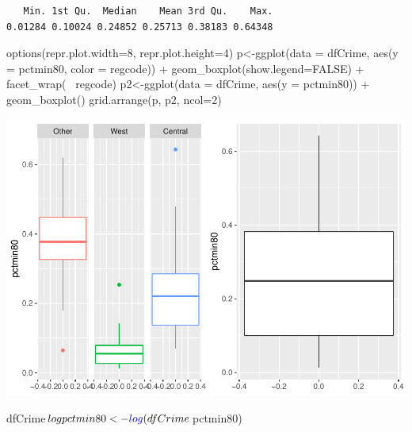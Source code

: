 \documentclass[]{article}
\newenvironment{Shaded}{}{}
\newcommand{\DataTypeTok}[1]{#1}
\newcommand{\DecValTok}[1]{#1}
\newcommand{\KeywordTok}[1]{\textcolor[rgb]{0.00,0.00,1.00}{#1}}
\newcommand{\NormalTok}[1]{#1}
\newcommand{\OperatorTok}[1]{#1}
\newcommand{\OtherTok}[1]{\textcolor[rgb]{1.00,0.25,0.00}{#1}}
\newcommand{\StringTok}[1]{\textcolor[rgb]{0.00,0.50,0.50}{#1}}
\begin{document}
\begin{verbatim}
   Min. 1st Qu.  Median    Mean 3rd Qu.    Max. 
0.01284 0.10024 0.24852 0.25713 0.38183 0.64348 
\end{verbatim}

\begin{Shaded}
\begin{Highlighting}[]
\KeywordTok{options}\NormalTok{(}\DataTypeTok{repr.plot.width=}\DecValTok{8}\NormalTok{, }\DataTypeTok{repr.plot.height=}\DecValTok{4}\NormalTok{)}
\NormalTok{p<-}\KeywordTok{ggplot}\NormalTok{(}\DataTypeTok{data =}\NormalTok{ dfCrime, }\KeywordTok{aes}\NormalTok{(}\DataTypeTok{y =}\NormalTok{ pctmin80, }\DataTypeTok{color =}\NormalTok{ regcode)) }\OperatorTok{+}\StringTok{ }
\StringTok{     }\KeywordTok{geom_boxplot}\NormalTok{(}\DataTypeTok{show.legend=}\OtherTok{FALSE}\NormalTok{) }\OperatorTok{+}\StringTok{ }\KeywordTok{facet_wrap}\NormalTok{(}\OperatorTok{~}\StringTok{ }\NormalTok{regcode)}
\NormalTok{p2<-}\KeywordTok{ggplot}\NormalTok{(}\DataTypeTok{data =}\NormalTok{ dfCrime, }\KeywordTok{aes}\NormalTok{(}\DataTypeTok{y =}\NormalTok{ pctmin80)) }\OperatorTok{+}
\StringTok{     }\KeywordTok{geom_boxplot}\NormalTok{()}
\KeywordTok{grid.arrange}\NormalTok{(p, p2, }\DataTypeTok{ncol=}\DecValTok{2}\NormalTok{)}
\end{Highlighting}
\end{Shaded}

\includegraphics{Bagnard_Gaustad_Hartman_Leung_Lab_3_files/figure-latex/unnamed-chunk-79-1.pdf}

\begin{Shaded}
\begin{Highlighting}[]
\NormalTok{dfCrime}\OperatorTok{$}\NormalTok{logpctmin80 <-}\StringTok{ }\KeywordTok{log}\NormalTok{(dfCrime}\OperatorTok{$}\NormalTok{pctmin80)}
\end{Highlighting}
\end{Shaded}
\end{document}
